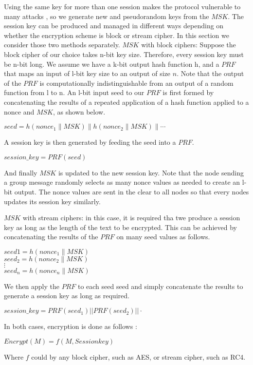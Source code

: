 Using the same key for more than one session makes the protocol vulnerable to many attacks \cite{Syverson}, so we generate new and pseudorandom keys from the $MSK$. The session key can be produced and managed in different ways depending on whether the encryption scheme is block or stream cipher. In this section we consider those two methods separately.  
$MSK$ with block ciphers: Suppose the block cipher of our
choice takes n-bit key size. Therefore, every session key must
be n-bit long. We assume we have a k-bit output hash function
h, and a $PRF$ that maps an input of l-bit key size to an output
of size $n$. Note that the output of the $PRF$ is computationally
indistinguishable from an output of a random function from
l to n. An l-bit input seed to our $PRF$ is first formed by
concatenating the results of a repeated application of a hash
function applied to a nonce and $MSK$, as shown below.
\begin{center}
$seed = h(nonce_1 \parallel MSK) \parallel h(nonce_2 \parallel MSK) \parallel \cdots$
\end{center}
A session key is then generated by feeding the seed into a
$PRF$.
\begin{center}
$session\_key = PRF(seed)$
\end{center}
And finally $MSK$ is updated to the new session key. 
Note that the node sending a group message randomly selects as many nonce values as needed to create an l-bit output. 
The nonce values are sent in the clear to all nodes so that every nodes updates its session key similarly.

$MSK$ with stream ciphers: in this case, it is required tha twe produce a session key as long as the length of the text
to be encrypted. This can be achieved by concatenating the
results of the $PRF$ on many seed values as follows.
\begin{center}
$seed 1 = h(nonce_1 \parallel MSK)$\\
$seed_2= h(nonce_2 \parallel MSK)$\\
$\vdots$ \\
$seed_n = h(nonce_n \parallel MSK)$
\end{center}

We then apply the $PRF$ to each seed seed and simply
concatenate the results to generate a session key as long as
required.
\begin{center}
$session\_key = PRF (seed_1) || PRF (seed_2) || \cdot$
\end{center}
In both cases, encryption is done as follows :
\begin{center}
$Encrypt(M) = f(M, Session key)$
\end{center}
Where $f$ could by any block cipher, such as AES, or stream
cipher, such as RC4.

